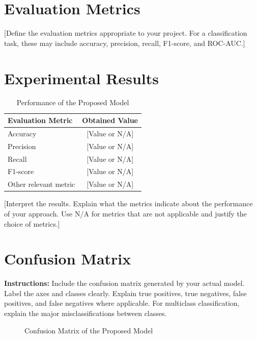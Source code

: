 \documentclass[12pt,a4paper]{report}
\begin{document}
\section{Evaluation Metrics}

[Define the evaluation metrics appropriate to your project.
For a classification task, these may include accuracy,
precision, recall, F1-score, and ROC-AUC.]

\section{Experimental Results}

\begin{table}[H]
\centering
\caption{Performance of the Proposed Model}
\begin{tabular}{|l|c|}
\hline
\textbf{Evaluation Metric} & \textbf{Obtained Value} \\
\hline
Accuracy & [Value or N/A] \\
\hline
Precision & [Value or N/A] \\
\hline
Recall & [Value or N/A] \\
\hline
F1-score & [Value or N/A] \\
\hline
Other relevant metric & [Value or N/A] \\
\hline
\end{tabular}
\end{table}

[Interpret the results. Explain what the metrics indicate
about the performance of your approach. Use N/A for metrics
that are not applicable and justify the choice of metrics.]

\section{Confusion Matrix}

\textbf{Instructions:}
Include the confusion matrix generated by your actual model.
Label the axes and classes clearly. Explain true positives,
true negatives, false positives, and false negatives
where applicable. For multiclass classification, explain
the major misclassifications between classes.

\begin{figure}[H]
\centering
{}
\caption{Confusion Matrix of the Proposed Model}
\label{fig:confusion}
\end{figure}
\end{document}
